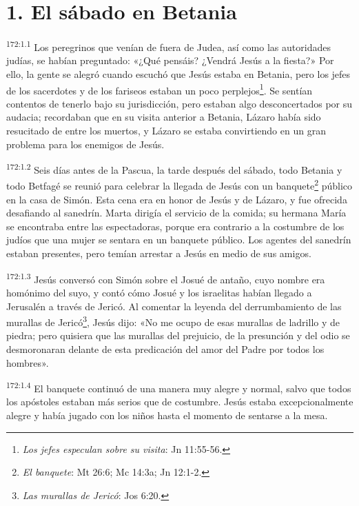 \section*{1. El sábado en Betania}
\par
\textsuperscript{172:1.1} Los peregrinos que venían de fuera de Judea, así como las autoridades judías, se habían preguntado: «¿Qué pensáis? ¿Vendrá Jesús a la fiesta?» Por ello, la gente se alegró cuando escuchó que Jesús estaba en Betania, pero los jefes de los sacerdotes y de los fariseos estaban un poco perplejos\footnote{\textit{Los jefes especulan sobre su visita}: Jn 11:55-56.}. Se sentían contentos de tenerlo bajo su jurisdicción, pero estaban algo desconcertados por su audacia; recordaban que en su visita anterior a Betania, Lázaro había sido resucitado de entre los muertos, y Lázaro se estaba convirtiendo en un gran problema para los enemigos de Jesús.

\par
\textsuperscript{172:1.2} Seis días antes de la Pascua, la tarde después del sábado, todo Betania y todo Betfagé se reunió para celebrar la llegada de Jesús con un banquete\footnote{\textit{El banquete}: Mt 26:6; Mc 14:3a; Jn 12:1-2.} público en la casa de Simón. Esta cena era en honor de Jesús y de Lázaro, y fue ofrecida desafiando al sanedrín. Marta dirigía el servicio de la comida; su hermana María se encontraba entre las espectadoras, porque era contrario a la costumbre de los judíos que una mujer se sentara en un banquete público. Los agentes del sanedrín estaban presentes, pero temían arrestar a Jesús en medio de sus amigos.

\par
\textsuperscript{172:1.3} Jesús conversó con Simón sobre el Josué de antaño, cuyo nombre era homónimo del suyo, y contó cómo Josué y los israelitas habían llegado a Jerusalén a través de Jericó. Al comentar la leyenda del derrumbamiento de las murallas de Jericó\footnote{\textit{Las murallas de Jericó}: Jos 6:20.}, Jesús dijo: «No me ocupo de esas murallas de ladrillo y de piedra; pero quisiera que las murallas del prejuicio, de la presunción y del odio se desmoronaran delante de esta predicación del amor del Padre por todos los hombres».

\par
\textsuperscript{172:1.4} El banquete continuó de una manera muy alegre y normal, salvo que todos los apóstoles estaban más serios que de costumbre. Jesús estaba excepcionalmente alegre y había jugado con los niños hasta el momento de sentarse a la mesa.

